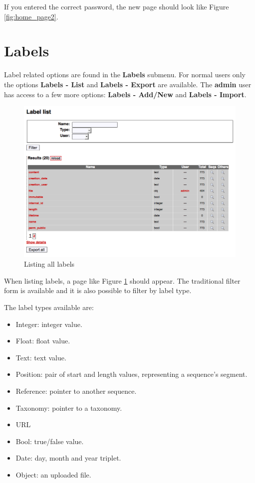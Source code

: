 If you entered the correct password, the new page should look like Figure \ref{fig:home_page2}.

\section{Labels}

Label related options are found in the \textbf{Labels} submenu. For normal users
only the options \textbf{Labels - List} and \textbf{Labels - Export} are available.
The \textbf{admin} user has access to a few more options: \textbf{Labels - Add/New} and
\textbf{Labels - Import}.

\begin{figure}[H]
  \centering
    \includegraphics[scale=0.4]{label_list.png}
  \caption{Listing all labels}
  \label{fig:label_list}
\end{figure}

When listing labels, a page like Figure \ref{fig:label_list} should appear. The traditional
filter form is available and it is also possible to filter by label type.

The label types available are:
\begin{itemize}
  \item Integer: integer value.
  \item Float: float value.
  \item Text: text value.
  \item Position: pair of start and length values, representing a sequence's segment.
  \item Reference: pointer to another sequence.
  \item Taxonomy: pointer to a taxonomy.
  \item URL
  \item Bool: true/false value.
  \item Date: day, month and year triplet.
  \item Object: an uploaded file.
\end{itemize}

